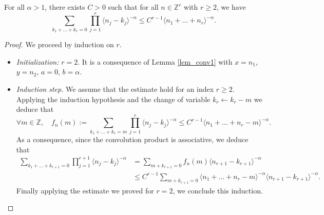 \begin{lemma}
\label{lemma_convol}
For all $\alpha>1$, there exists $C>0$ such that for all $n\in \mathbb{Z}^r$ with $r\geq 2$, we have
\[
\sum_{k_1+\dots+k_r = 0} \prod_{j=1}^r \langle n_j - k_j \rangle^{-\alpha} \leq C^{r-1} \langle n_1 + \dots + n_r \rangle^{-\alpha}.
\]
\end{lemma}
\begin{proof} We proceed by induction on $r$.
\begin{itemize}
\item
\emph{Initialization:} $r =2$. It is a consequence of Lemma \ref{lem_conv1} with $x= n_1$, $y=n_2$, $a=0$, $b=\alpha$.

\item
\emph{Induction step.} We assume that the estimate hold for an index $r\geq 2$. Applying the induction hypothesis and the change of variable $k_r \leftarrow k_r-m$ we deduce that
\[
\forall m \in \mathbb{Z}, \quad f_n(m):=\sum_{k_1+\dots+k_r = m} \prod_{j=1}^r \langle n_j - k_j \rangle^{-\alpha} \leq C^{r-1} \langle n_1 + \dots + n_r -m \rangle^{-\alpha}.
\]
As a consequence, since the convolution product is associative, we deduce that
\begin{equation*}
\begin{split}
\sum_{k_1+\dots+k_{r+1} = 0} \prod_{j=1}^{r+1} \langle n_j - k_j \rangle^{-\alpha} &= \sum_{m+k_{r+1} = 0} f_n(m) \langle n_{r+1} - k_{r+1} \rangle^{-\alpha} \\
&\leq C^{r-1} \! \! \sum_{m+k_{r+1} = 0} \! \! \langle n_1 + \dots + n_r -m \rangle^{-\alpha} \langle n_{r+1} - k_{r+1} \rangle^{-\alpha}.
\end{split}
\end{equation*}
Finally applying the estimate we proved for $r=2$, we conclude this induction.\qedhere
\end{itemize}
\end{proof}

